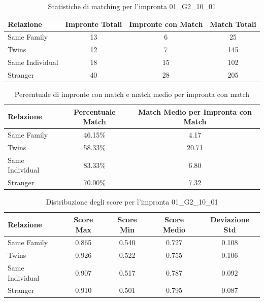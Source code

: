 \begin{table}[htbp]
\centering
\caption{Statistiche di matching per l'impronta 01\_G2\_10\_01}
\label{tab:results_01_G2_10_01}
\begin{tabular}{|l|c|c|c|}
\hline
\textbf{Relazione} & \textbf{Impronte Totali} & \textbf{Impronte con Match} & \textbf{Match Totali} \\
\hline
Same Family & 13 & 6 & 25 \\
\hline
Twins & 12 & 7 & 145 \\
\hline
Same Individual & 18 & 15 & 102 \\
\hline
Stranger & 40 & 28 & 205 \\
\hline
\end{tabular}
\end{table}


\begin{table}[htbp]
\centering
\caption{Percentuale di impronte con match e match medio per impronta con match}
\label{tab:match_percentage_01_G2_10_01}
\begin{tabular}{|l|c|c|}
\hline
\textbf{Relazione} & \textbf{Percentuale Match} & \textbf{Match Medio per Impronta con Match} \\
\hline
Same Family & 46.15\% & 4.17 \\
\hline
Twins & 58.33\% & 20.71 \\
\hline
Same Individual & 83.33\% & 6.80 \\
\hline
Stranger & 70.00\% & 7.32 \\
\hline
\end{tabular}
\end{table}


\begin{table}[htbp]
\centering
\caption{Distribuzione degli score per l'impronta 01\_G2\_10\_01}
\label{tab:scores_01_G2_10_01}
\begin{tabular}{|l|c|c|c|c|}
\hline
\textbf{Relazione} & \textbf{Score Max} & \textbf{Score Min} & \textbf{Score Medio} & \textbf{Deviazione Std} \\
\hline
Same Family & 0.865 & 0.540 & 0.727 & 0.108 \\
\hline
Twins & 0.926 & 0.522 & 0.755 & 0.106 \\
\hline
Same Individual & 0.907 & 0.517 & 0.787 & 0.092 \\
\hline
Stranger & 0.910 & 0.501 & 0.795 & 0.087 \\
\hline
\end{tabular}
\end{table}

